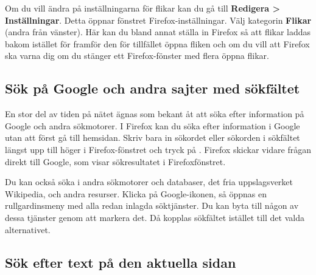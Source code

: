 \documentclass[a4paper,final]{memoir} %
\begin{document}
Om du vill ändra på inställningarna för flikar kan du gå till \textbf{Redigera \textgreater{} Inställningar}. Detta öppnar fönstret Firefox-inställningar. Välj kategorin \textbf{Flikar} (andra från vänster). Här kan du bland annat ställa in Firefox så att flikar laddas bakom istället för framför den för tillfället öppna fliken och om du vill att Firefox ska varna dig om du stänger ett Firefox-fönster med flera öppna flikar.



\subsection{Sök på Google och andra sajter med sökfältet}


En stor del av tiden på nätet ägnas som bekant åt att söka efter information på Google och andra sökmotorer. I Firefox kan du söka efter information i Google utan att först gå till hemsidan. Skriv bara in sökordet eller sökorden i sökfältet längst upp till höger i Firefox-fönstret och tryck på \xenter{}. Firefox skickar vidare frågan direkt till Google, som visar sökresultatet i Firefoxfönstret. 

Du kan också söka i andra sökmotorer och databaser, det fria uppslagsverket Wikipedia, och andra resurser. Klicka på Google-ikonen, så öppnas en rullgardinsmeny med alla redan inlagda söktjänster. Du kan byta till någon av dessa tjänster genom att markera det. Då kopplas sökfältet istället till det valda alternativet.



\subsection{Sök efter text på den aktuella sidan}
\end{document}
